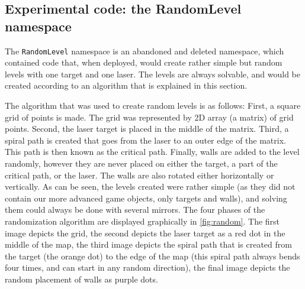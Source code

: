		\subsection{Experimental code: the RandomLevel namespace} \label{ssec:randomlevelnamespace}
			The \texttt{RandomLevel} namespace is an abandoned and deleted
			namespace, which contained code that, when deployed, would create
			rather simple but random levels with one target and one laser.
			The levels are always solvable, and would be created according 
			to an algorithm that is explained in this section.
			
			The algorithm that was used to create random levels is as follows:
			First, a square grid of points is made. The grid was represented by
			2D array (a matrix) of grid points. Second, the laser target is
			placed in the middle of the matrix. Third, a spiral path is created that
			goes from the laser to an outer edge of the matrix. This path is then
			known as the critical path. Finally, walls are added to the level randomly,
			however they are never placed on either the target, a part of the
			critical path, or the laser. The walls are also rotated either
			horizontally or vertically. As can be seen, the levels created were
			rather simple (as they did not contain our more advanced game
			objects, only targets and walls), and solving them could always be done
			with several mirrors. The four phases of the randomization algorithm
			are displayed graphically in \ref{fig:random}. The first image depicts
			the grid, the second depicts the laser target as a red dot in the
			middle of the map, the third image depicts the spiral path that
			is created from the target (the orange dot) to the edge of the map 
			(this spiral path always bends four times, and can start in any 
			random direction), the final image depicts the random placement of
			walls as purple dots.
			
